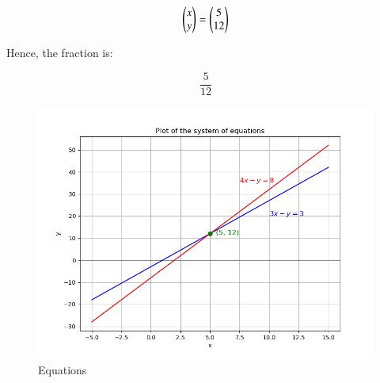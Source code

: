 \documentclass[12pt]{article}
\begin{document}
\begin{align}
\begin{pmatrix}x \\ y\end{pmatrix} = \begin{pmatrix}5 \\ 12\end{pmatrix}
\end{align}

Hence, the fraction is:

\[
\boxed{\frac{5}{12}}
\]

\begin{figure}[H]\centering
\includegraphics[width=1\columnwidth]{figs/plt.png}
\caption{Equations}
\label{fig:plt}
\end{figure}
\end{document}
